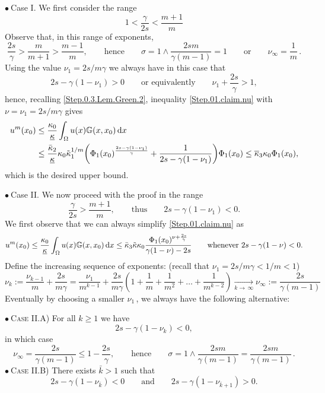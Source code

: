 \documentclass[11pt]{article}
\numberwithin{equation}{section}
\newcommand{\dx}{\,{\rm d}x}
\newcommand{\ka}{\overline{\kappa}}
\newcommand{\kb}{\underline{\kappa}}
\newcommand{\K}{{\mathbb G}}
\begin{document}
\noindent$\bullet~${\sc Case I. }
We first consider the range
$$
1<\frac{\gamma}{2s} < \frac{m+1}{m}
$$
Observe that, in this range of exponents,
\[
\frac{2s}{\gamma} > \frac{m}{m+1}>\frac{m-1}{m},\qquad\mbox{hence}\qquad \sigma=1\wedge\frac{2sm}{\gamma(m-1)}=1\qquad\mbox{or}\qquad \nu_\infty=\frac{1}{m}\,.
\]
Using the value $\nu_1=2s/m\gamma$ we always have in this case that
\[
2s-\gamma(1-\nu_1)> 0\qquad\mbox{or equivalently}\qquad  \nu_1+\frac{2s}{\gamma}> 1,
\]
hence, recalling \eqref{Step.0.3.Lem.Green.2}, inequality \eqref{Step.01.claim.nu} with $\nu=\nu_1=2s/m\gamma$ gives
\begin{equation}\label{Case.I.01}
\begin{split}
u^{m}(x_0) &\le
\frac{\kappa_0}{\kb}  \int_{\Omega}  u(x)  \K(x,x_0)\dx\\
&  \leq \frac{\bar \kappa_2}{\kb }\kappa_0 \tilde\kappa_1^{1/m} \biggl(\Phi_1(x_0)^{\frac{2s-\gamma(1-\nu_1)}{\gamma}}+ \frac{1}{2s-\gamma(1-\nu_1)}\biggr)\Phi_1(x_0) \le \ka_3\kappa_0\Phi_1(x_0),
\end{split}
\end{equation}
which is the desired upper bound.

\noindent$\bullet~${\sc Case II. }We now proceed with the proof in the range
$$
\frac{\gamma}{2s} > \frac{m+1}{m},\qquad \text{thus}\qquad 2s-\gamma(1-\nu_1)< 0.
$$
We first observe that we can always simplify
\eqref{Step.01.claim.nu} as
\begin{equation}\label{Step.01.claim.nu2}
u^{m}(x_0)\leq \frac{\kappa_0}{\kb}  \int_{\Omega}  u(x)  \K(x,x_0)\dx \le  \bar\kappa_3\tilde \kappa\kappa_0 \frac{ \Phi_1(x_0)^{\nu+\frac{2s}{\gamma}}}{\gamma(1-\nu)-2s}\qquad \text{whenever $2s-\gamma(1-\nu)< 0$}.
\end{equation}
Define the increasing sequence of exponents: (recall that $\nu_1=2s/m\gamma <1/m<1$)
\begin{equation}\label{Case.II.nuk}
\nu_{k}:=\frac{\nu_{k-1}}{m}+\frac{2s}{m\gamma}
=\frac{\nu_1}{m^{k-1}}+\frac{2s}{m\gamma}\left(1+\frac{1}{m}+\frac{1}{m^2}+\dots+\frac{1}{m^{k-2}}\right)\xrightarrow[k\to\, \infty]{}\nu_\infty:=\frac{2s}{\gamma(m-1)}
\end{equation}
Eventually by choosing a smaller $\nu_1$\,, we always have the following alternative:

\noindent$\bullet~$\textsc{Case II.A}) For all $k\ge 1$ we have
\[
2s-\gamma(1-\nu_k)< 0,
\]
in which case
\[
\nu_\infty=\frac{2s}{\gamma(m-1)}\le 1-\frac{2s}{\gamma},\qquad\mbox{hence}\qquad \sigma=1\wedge\frac{2sm}{\gamma(m-1)}=\frac{2sm}{\gamma(m-1)}\,.
\]
\noindent$\bullet~$\textsc{Case II.B}) There exists $\bar k>1$ such that
\[
2s-\gamma(1-\nu_{\bar k})< 0\qquad\mbox{and}\qquad
2s-\gamma(1-\nu_{\bar k+1})> 0.
\]
\end{document}
